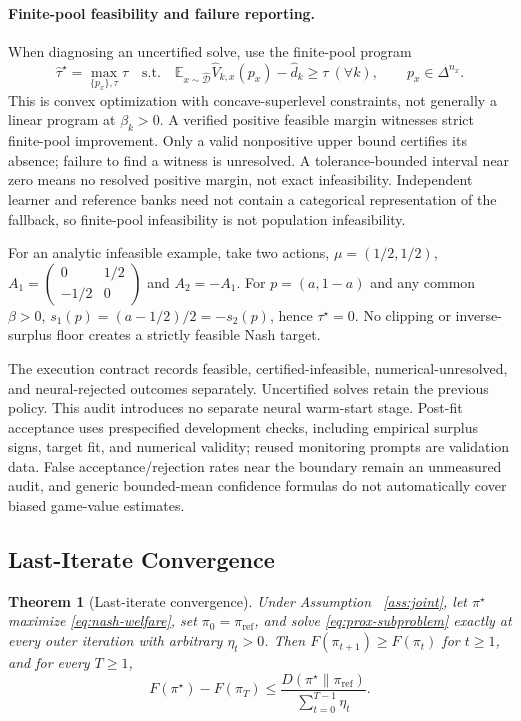 \documentclass{article}
\makeatletter
\let\revieworiginalref\ref
\newcommand{\reviewref}[1]{%
  \@ifundefined{r@#1}{\textnormal{[original-draft ref.: \texttt{\detokenize{#1}}]}}%
  {\revieworiginalref{#1}}}
\let\ref\reviewref
\newtheorem{theorem}{Theorem}
\theoremstyle{remark}
\theoremstyle{plain}
\newcommand{\E}{\mathbb{E}}
\newcommand{\piref}{\pi_{\mathrm{ref}}}
\makeatother
\begin{document}
\paragraph{Finite-pool feasibility and failure reporting.}
\label{app:feasibility}
When diagnosing an uncertified solve, use the finite-pool program
\[
\widehat\tau^\star=\max_{\{p_x\},\tau}\tau
\quad\text{s.t.}\quad
\E_{x\sim\widehat{\mathcal D}}\widehat V_{k,x}(p_x)-\widehat d_k\ge\tau\ (\forall k),
\qquad p_x\in\Delta^{n_x}.
\]
This is convex optimization with concave-superlevel constraints, not generally a linear program at $\beta_k>0$. A verified positive feasible margin witnesses strict finite-pool improvement. Only a valid nonpositive upper bound certifies its absence; failure to find a witness is unresolved. A tolerance-bounded interval near zero means no resolved positive margin, not exact infeasibility. Independent learner and reference banks need not contain a categorical representation of the fallback, so finite-pool infeasibility is not population infeasibility.

For an analytic infeasible example, take two actions, $\mu=(1/2,1/2)$, $A_1=\left(\begin{smallmatrix}0&1/2\\-1/2&0\end{smallmatrix}\right)$ and $A_2=-A_1$. For $p=(a,1-a)$ and any common $\beta>0$, $s_1(p)=(a-1/2)/2=-s_2(p)$, hence $\tau^\star=0$. No clipping or inverse-surplus floor creates a strictly feasible Nash target.

The execution contract records feasible, certified-infeasible, numerical-unresolved, and neural-rejected outcomes separately. Uncertified solves retain the previous policy. This audit introduces no separate neural warm-start stage. Post-fit acceptance uses prespecified development checks, including empirical surplus signs, target fit, and numerical validity; reused monitoring prompts are validation data. False acceptance/rejection rates near the boundary remain an unmeasured audit, and generic bounded-mean confidence formulas do not automatically cover biased game-value estimates.

\subsection{Last-Iterate Convergence}
\label{app:convergence}
\begin{theorem}[Last-iterate convergence]
\label{thm:last-iterate}
Under Assumption~\ref{ass:joint}, let $\pi^\star$ maximize \eqref{eq:nash-welfare}, set $\pi_0=\piref$, and solve \eqref{eq:prox-subproblem} exactly at every outer iteration with arbitrary $\eta_t>0$. Then $F(\pi_{t+1})\ge F(\pi_t)$ for $t\ge1$, and for every $T\ge1$,
\begin{equation}
F(\pi^\star)-F(\pi_T)
\le
\frac{D(\pi^\star\|\piref)}{\sum_{t=0}^{T-1}\eta_t}.
\label{eq:last-iterate-rate}
\end{equation}
\end{theorem}
\end{document}
